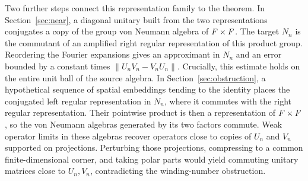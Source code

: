 Two further steps connect this representation family to the theorem.
In Section~\ref{sec:near}, a diagonal unitary built from the two
representations conjugates a copy of the group von Neumann algebra of
$F\times F$.  The target $N_n$ is the commutant of an amplified right
regular representation of this product group.  Reordering the Fourier
expansions gives an approximant in $N_n$ and an error bounded by a
constant times $\|U_nV_n-V_nU_n\|$.  Crucially, this estimate holds on the
entire unit ball of the source algebra.  In
Section~\ref{sec:obstruction}, a hypothetical sequence of spatial
embeddings tending to the identity places the conjugated left regular
representation in $N_n$, where it commutes with the right regular
representation.  Their pointwise product is then a representation of
$F\times F$, so the von Neumann algebras generated by its two factors
commute.  Weak operator
limits in these algebras recover operators close to copies of
$U_n$ and $V_n$ supported on projections.  Perturbing those projections,
compressing to a common finite-dimensional corner, and taking polar
parts would yield
commuting unitary matrices close to $U_n,V_n$, contradicting the
winding-number obstruction.
